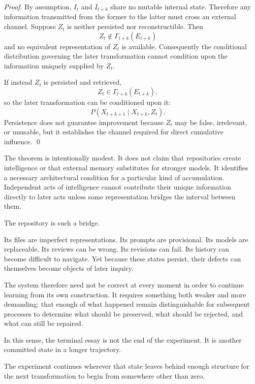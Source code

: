 \documentclass[11pt]{article}
\begin{document}
\begin{proof}
By assumption, \(I_t\) and \(I_{t+k}\) share no mutable internal state. Therefore any information transmitted from the former to the latter must cross an external channel. Suppose \(Z_t\) is neither persisted nor reconstructible. Then
\[
    Z_t\notin\Gamma_{t+k}(E_{t+k})
\]
and no equivalent representation of \(Z_t\) is available. Consequently the conditional distribution governing the later transformation cannot condition upon the information uniquely supplied by \(Z_t\).

If instead \(Z_t\) is persisted and retrieved,
\[
    Z_t\in\Gamma_{t+k}(E_{t+k}),
\]
so the later transformation can be conditioned upon it:
\[
    P(
        X_{t+k+1}
        \mid
        X_{t+k},
        Z_t
    ).
\]
Persistence does not guarantee improvement because \(Z_t\) may be false, irrelevant, or unusable, but it establishes the channel required for direct cumulative influence. \qed
\end{proof}

The theorem is intentionally modest. It does not claim that repositories create intelligence or that external memory substitutes for stronger models. It identifies a necessary architectural condition for a particular kind of accumulation. Independent acts of intelligence cannot contribute their unique information directly to later acts unless some representation bridges the interval between them.

The repository is such a bridge.

Its files are imperfect representations. Its prompts are provisional. Its models are replaceable. Its reviews can be wrong. Its revisions can fail. Its history can become difficult to navigate. Yet because these states persist, their defects can themselves become objects of later inquiry.

The system therefore need not be correct at every moment in order to continue learning from its own construction. It requires something both weaker and more demanding: that enough of what happened remain distinguishable for subsequent processes to determine what should be preserved, what should be rejected, and what can still be repaired.

In this sense, the terminal essay is not the end of the experiment. It is another committed state in a longer trajectory.

The experiment continues wherever that state leaves behind enough structure for the next transformation to begin from somewhere other than zero.
\end{document}
